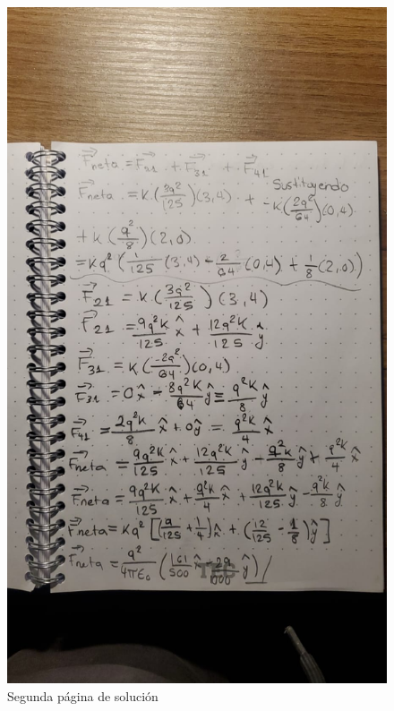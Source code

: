 \documentclass[12pt, letterpaper]{report}
\begin{document}
\begin{figure}[H]
    \centering
    \includegraphics[height = 20cm]{2024-04-03_ProblemaCoulomb_2.jpeg}
    \caption{Segunda página de solución}
\end{figure}
\end{document}
